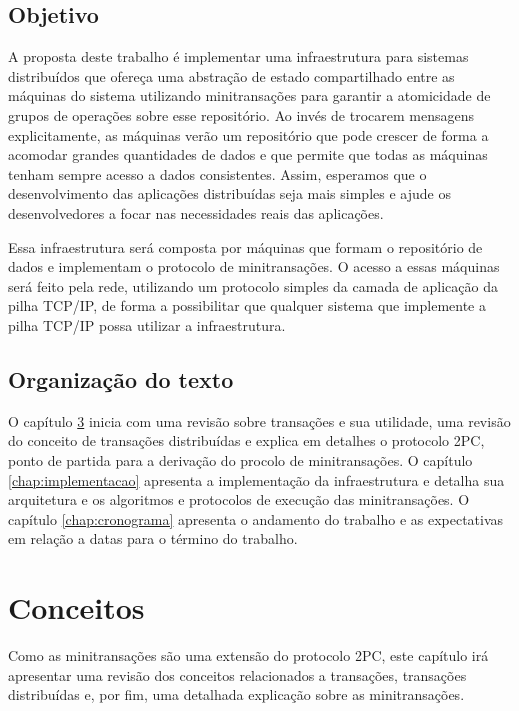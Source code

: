 \documentclass[11pt,twoside,a4paper]{book}
\begin{document}
\section{Objetivo}
\label{sec:objetivo}
A proposta deste trabalho é implementar uma infraestrutura para sistemas distribuídos que ofereça uma abstração de estado compartilhado entre as máquinas do sistema utilizando minitransações para garantir a atomicidade de grupos de operações sobre esse repositório. Ao invés de trocarem mensagens explicitamente, as máquinas verão um repositório que pode crescer de forma a acomodar grandes quantidades de dados e que permite que todas as máquinas tenham sempre acesso a dados consistentes. Assim, esperamos que o desenvolvimento das aplicações distribuídas seja mais simples e ajude os desenvolvedores a focar nas necessidades reais das aplicações.

Essa infraestrutura será composta por máquinas que formam o repositório de dados e implementam o protocolo de minitransações. O acesso a essas máquinas será feito pela rede, utilizando um protocolo simples da camada de aplicação da pilha TCP/IP, de forma a possibilitar que qualquer sistema que implemente a pilha TCP/IP possa utilizar a infraestrutura.

\section{Organização do texto}
\label{sec:organizacao_do_texto}
O capítulo \ref{chap:conceitos} inicia com uma revisão sobre transações e sua utilidade, uma revisão do conceito de transações distribuídas e explica em detalhes o protocolo 2PC, ponto de partida para a derivação do procolo de minitransações. O capítulo \ref{chap:implementacao} apresenta a implementação da infraestrutura e detalha sua arquitetura e os algoritmos e protocolos de execução das minitransações. O capítulo \ref{chap:cronograma} apresenta o andamento do trabalho e as expectativas em relação a datas para o término do trabalho.

\chapter{Conceitos}
\label{chap:conceitos}
Como as minitransações são uma extensão do protocolo 2PC, este capítulo irá apresentar uma revisão dos conceitos relacionados a transações, transações distribuídas e, por fim, uma detalhada explicação sobre as minitransações.
\end{document}
